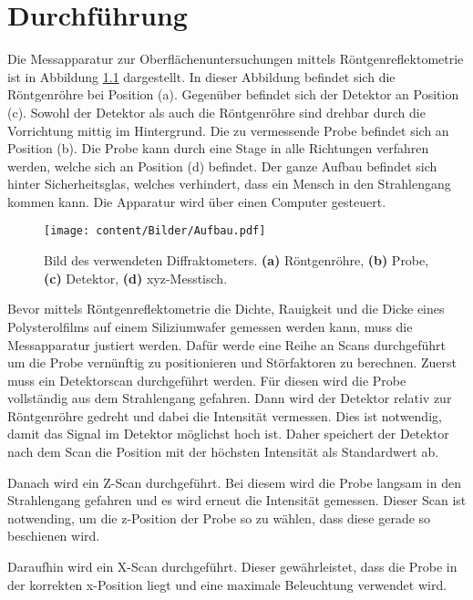 \chapter{Durchführung}
\label{cha:Durchführung}

Die Messapparatur zur Oberflächenuntersuchungen mittels Röntgenreflektometrie ist in Abbildung \ref{fig:Aufbau} dargestellt. In dieser Abbildung befindet sich die Röntgenröhre bei 
Position (a). Gegenüber befindet sich der Detektor an Position (c). Sowohl der Detektor als auch die Röntgenröhre sind drehbar durch die Vorrichtung mittig im Hintergrund. 
Die zu vermessende Probe befindet sich an Position (b). Die Probe kann durch eine Stage in alle Richtungen verfahren werden, welche sich an Position (d) befindet. Der ganze Aufbau 
befindet sich hinter Sicherheitsglas, welches verhindert, dass ein Mensch in den Strahlengang kommen kann. Die Apparatur wird über einen Computer gesteuert.  

\begin{figure}
    \centering
    \texttt{[image: content/Bilder/Aufbau.pdf]}
    \caption{Bild des verwendeten Diffraktometers. \textbf{(a)} Röntgenröhre, \textbf{(b)} Probe, \textbf{(c)} Detektor, \textbf{(d)} xyz-Messtisch.}
    \label{fig:Aufbau}
\end{figure}

Bevor mittels Röntgenreflektometrie die Dichte, Rauigkeit und die Dicke eines Polysterolfilms auf einem Siliziumwafer gemessen werden kann, muss die Messapparatur justiert werden. 
Dafür werde eine Reihe an Scans durchgeführt um die Probe vernünftig zu positionieren und Störfaktoren zu berechnen. Zuerst muss ein Detektorscan durchgeführt werden. Für diesen 
wird die Probe vollständig aus dem Strahlengang gefahren. Dann wird der Detektor relativ zur Röntgenröhre gedreht und dabei die Intensität vermessen. Dies ist notwendig, damit das 
Signal im Detektor möglichst hoch ist. Daher speichert der Detektor nach dem Scan die Position mit der höchsten Intensität als Standardwert ab. 

Danach wird ein Z-Scan durchgeführt. Bei diesem wird die Probe langsam in den Strahlengang gefahren und es wird erneut die Intensität gemessen. Dieser Scan ist notwending, um die 
z-Position der Probe so zu wählen, dass diese gerade so beschienen wird.

Daraufhin wird ein X-Scan durchgeführt. Dieser gewährleistet, dass die Probe in der korrekten x-Position liegt und eine maximale Beleuchtung verwendet wird. 


